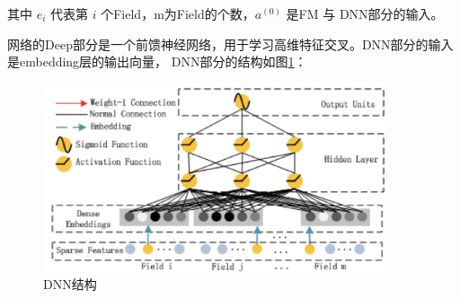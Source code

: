 其中 $ e_i $ 代表第 $ i $ 个Field，m为Field的个数，$ a^{(0)} $ 是FM 与 DNN部分的输入。

网络的Deep部分是一个前馈神经网络，用于学习高维特征交叉。DNN部分的输入是embedding层的输出向量，
DNN部分的结构如图\ref{DeepFM-DNN}：
\begin{figure}[htb]
  \vspace{13pt} %
  \centering
  \includegraphics[width=0.9\textwidth]{images/DeepFM-DNN.png}
  \caption{DNN结构\cite{guo2017deepfm}}\label{DeepFM-DNN} %
\end{figure}

